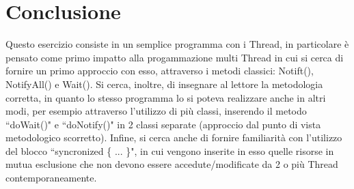 \chapter*{Conclusione} %
Questo esercizio consiste in un semplice programma con i Thread, in particolare è pensato come primo impatto
alla progammazione multi Thread in cui si cerca di fornire un primo approccio con esso, attraverso i metodi 
classici: Notift(), NotifyAll() e Wait().
Si cerca, inoltre, di insegnare al lettore la metodologia corretta, in quanto lo stesso programma lo si poteva realizzare anche in altri modi, per esempio attraverso l'utilizzo di più classi, inserendo il metodo ``doWait()" e ``doNotify()" in 2
classi separate (approccio dal punto di vista metodologico scorretto).
Infine, si cerca anche di fornire familiarità con l'utilizzo del blocco ``syncronized \{ ... \}", in cui vengono
inserite in esso quelle risorse in mutua esclusione che non devono essere accedute/modificate da 2 o più Thread 
contemporaneamente.